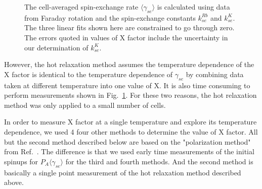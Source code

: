 \begin{figure}[t!]
	\centering
	\caption{{The cell-averaged spin-exchange rate $\langle\gamma_{se}\rangle$ is calculated using data from Faraday rotation and the spin-exchange constants $k_{se}^{Rb}$ and $k_{se}^{K}$. The three linear fits shown here are constrained to go through zero. The errors quoted in values of X factor include the uncertainty in our determination of $k_{se}^{K}$.}}
	\label{hotrelaxation}
\end{figure}

However, the hot relaxation method assumes the temperature dependence of the X factor is identical to the temperature dependence of $\gamma_{se}$ by combining data taken at different temperature into one value of X. It is also time consuming to perform measurements shown in Fig.~\ref{hotrelaxation}. For these two reasons, the hot relaxation method was only applied to a small number of cells. 

In order to measure X factor at a single temperature and explore its temperature dependence, we used 4 four other methods to determine the value of X factor. All but the second method described below are based on the "polarization method" from Ref.~\cite{PhysRevLett.96.083003}. The difference is that we used early time measurements of the initial spinups for $P_A\langle\gamma_{se}\rangle$ for the third and fourth methods. And the second method is basically a single point measurement of the hot relaxation method described above.

